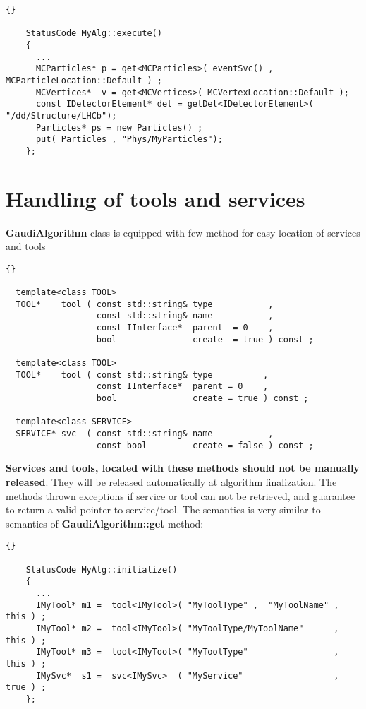 \documentclass{lhcbnote}
\newcommand{\bftt}         {\ttfamily\bfseries}
\begin{document}
\begin{scriptsize}
 \begin{lstlisting}{}

    StatusCode MyAlg::execute() 
    {
      ...
      MCParticles* p = get<MCParticles>( eventSvc() , MCParticleLocation::Default ) ; 
      MCVertices*  v = get<MCVertices>( MCVertexLocation::Default );
      const IDetectorElement* det = getDet<IDetectorElement>( "/dd/Structure/LHCb");
      Particles* ps = new Particles() ;
      put( Particles , "Phys/MyParticles");
    };

 \end{lstlisting}
\end{scriptsize}


\section{Handling of tools and services}

{\bftt{GaudiAlgorithm}} class is equipped with few method for 
easy location of services and tools

\begin{scriptsize}
 \begin{lstlisting}{}

  template<class TOOL>
  TOOL*    tool ( const std::string& type           , 
                  const std::string& name           , 
                  const IInterface*  parent  = 0    , 
                  bool               create  = true ) const ;

  template<class TOOL>
  TOOL*    tool ( const std::string& type          , 
                  const IInterface*  parent = 0    , 
                  bool               create = true ) const ;

  template<class SERVICE>
  SERVICE* svc  ( const std::string& name           , 
                  const bool         create = false ) const ;

 \end{lstlisting}
\end{scriptsize}

{\bf{Services and tools, located with these methods should not 
be manually released}}. They will be released automatically 
at algorithm finalization. The methods thrown exceptions if
service or tool can not be retrieved, and guarantee to
return a valid pointer to service/tool. 
The semantics is very similar to semantics of 
{\bftt{GaudiAlgorithm::get}} method:

\begin{scriptsize}
 \begin{lstlisting}{}

    StatusCode MyAlg::initialize() 
    {
      ...
      IMyTool* m1 =  tool<IMyTool>( "MyToolType" ,  "MyToolName" , this ) ;
      IMyTool* m2 =  tool<IMyTool>( "MyToolType/MyToolName"      , this ) ;
      IMyTool* m3 =  tool<IMyTool>( "MyToolType"                 , this ) ;
      IMySvc*  s1 =  svc<IMySvc>  ( "MyService"                  , true ) ;
    };

 \end{lstlisting}
\end{scriptsize}
\end{document}
